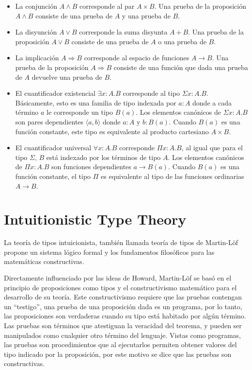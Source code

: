 \documentclass[]{report}
\begin{document}
	\begin{itemize}
		\item La conjunción $A \wedge B$ corresponde al par $A \times B$.
		Una prueba de la proposición $A \wedge B$ consiste de una prueba de $A$ y una prueba de $B$.
		
		\item La disyunción $A \vee B$ corresponde la suma disyunta $A + B$.
		Una prueba de la proposición $A \vee B$ consiste de una prueba de $A$ o una prueba de $B$.
		
		\item La implicación $A \Rightarrow B$ corresponde al espacio de funciones $A \rightarrow B$.
		Una prueba de la proposición $A \Rightarrow B$ consiste de una función que dada una prueba de $A$ devuelve una prueba de $B$.
		
		\item El cuantificador existencial $\exists x:A.B$ corresponde al tipo $\Sigma x:A.B$.
		Básicamente, esto es una familia de tipo indexada por $a : A$ donde a cada término $a$ le corresponde un tipo $B(a)$.
		Los elementos canónicos de $\Sigma x:A.B$ son pares dependientes $\langle a, b \rangle$ donde $a:A$ y $b:B(a)$.
		Cuando $B(a)$ es una función constante, este tipo es equivalente al producto cartesiano $A \times B$.
		
		
		\item El cuantificador universal $\forall x:A.B$ corresponde $\Pi x:A.B$, al igual que para el tipo $\Sigma$, $B$ está indexado por los términos de tipo $A$.
		Los elementos canónicos de $\Pi x:A.B$ son funciones dependientes $a \rightarrow B(a)$.
		Cuando $B(a)$ es una función constante, el tipo $\Pi$ es equivalente al tipo de las funciones ordinarias $A \rightarrow B$.
	\end{itemize}
	

	\section{Intuitionistic Type Theory}
	La teoría de tipos intuicionista, también llamada teoría de tipos de Martin-Löf \cite{ITT} propone un sistema lógico formal y los fundamentos filosóficos para las matemáticas constructivas.
	
	Directamente influenciado por las ideas de Howard, Martin-Löf se basó en el principio de proposiciones como tipos y el constructivismo matemático para el desarrollo de su teoría.
	Este constructivismo requiere que las pruebas contengan un ``testigo'', una prueba de una proposición dada es un programa, por lo tanto, las proposiciones son verdaderas cuando su tipo está habitado por algún término.
	Las pruebas son términos que atestiguan la veracidad del teorema, y pueden ser manipulados como cualquier otro término del lenguaje.
	Vistas como programas, las pruebas son procedimientos que al ejecutarlos permiten obtener valores del tipo indicado por la proposición, por este motivo se dice que las pruebas son constructivas.
	
\end{document}
